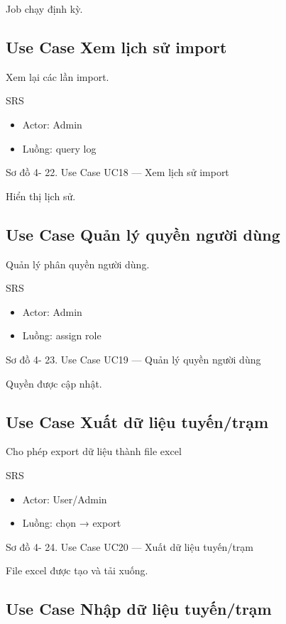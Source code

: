 \documentclass[13pt,a4paper]{report}
\begin{document}
Job chạy định kỳ.

\subsection{Use Case Xem lịch sử import}

Xem lại các lần import.

SRS

\begin{itemize}
    \item Actor: Admin
    \item Luồng: query log
\end{itemize}

Sơ đồ 4- 22. Use Case UC18 — Xem lịch sử import

Hiển thị lịch sử.

\subsection{Use Case Quản lý quyền người dùng}

Quản lý phân quyền người dùng.

SRS

\begin{itemize}
    \item Actor: Admin
    \item Luồng: assign role
\end{itemize}

Sơ đồ 4- 23.  Use Case UC19 — Quản lý quyền người dùng

Quyền được cập nhật.

\subsection{Use Case Xuất dữ liệu tuyến/trạm}

Cho phép export dữ liệu thành file excel

SRS

\begin{itemize}
    \item Actor: User/Admin
    \item Luồng: chọn → export
\end{itemize}

Sơ đồ 4- 24. Use Case UC20 — Xuất dữ liệu tuyến/trạm

File excel được tạo và tải xuống.

\subsection{Use Case Nhập dữ liệu tuyến/trạm}
\end{document}
